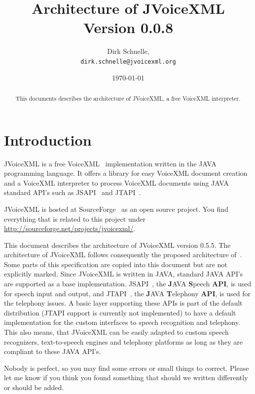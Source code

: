 \documentclass[11pt,a4paper]{article}
\title{Architecture of JVoiceXML \\
Version 0.0.8}
\author{Dirk Schnelle,  \\
  \texttt{dirk.schnelle@jvoicexml.org} }
\date{\today}
\begin{document}
\pagestyle{headings}

\maketitle

\begin{abstract}
This documents describes the architecture of JVoiceXML, a free
VoiceXML interpreter.
\end{abstract}

\tableofcontents

\section{Introduction}
\label{sec:introduction}

JVoiceXML is a free VoiceXML~\cite{w3.org:voicexml} implementation written in 
the JAVA programming language. It offers a library for easy VoiceXML
document creation and a VoiceXML interpreter to process 
VoiceXML documents using JAVA standard API's such as JSAPI~\cite{sun:jsapi} and
JTAPI~\cite{sun:jtapi}.

JVoiceXML is hosted at SourceForge~\cite{sourceforge} as an open source 
project.
You find everything that is related to this project under
\url{http://sourceforge.net/projects/jvoicexml/}.

This document describes the architecture of JVoiceXML version 0.5.5. The
architecture of JVoiceXML follows
consequently the proposed architecture of~\cite{w3.org:voicexml}.
Some parts of this specification are copied into this document
but are not explicitly marked.
Since JVoiceXML is written in JAVA, standard JAVA API's are supported as a base
implementation. JSAPI~\cite{sun:jsapi}, the \textbf{J}AVA \textbf{S}peech
\textbf{API}, is used for speech input and output,
and JTAPI~\cite{sun:jtapi}, the \textbf{J}AVA \textbf{T}elephony \textbf{API}, is used for the 
telephony issues. 
A basic layer supporting these APIs is part of the default distribution (JTAPI
support is currently not implemented) to have a default implementation for the
custom interfaces to speech recognition and telephony. This
also means, that JVoiceXML can be easily adapted to custom speech recognizers,
text-to-speech engines and telephony platforms as long as they
are compliant to these JAVA API's.

Nobody is perfect, so you may find some errors or small things to correct.
Please let me know if you think you found something that should we written
differently or should be added.
\end{document}
